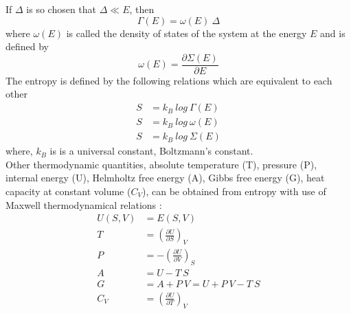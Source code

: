 If $\Delta $ is so chosen that $\Delta \ll E $, then
\begin{equation}
\Gamma(E) = \omega (E) ~ \Delta
\end{equation}
where $\omega(E)$ is called the density of states of the system at the energy $E$ and is
defined by 
\begin{equation}
\omega(E)= \frac{\partial \Sigma (E)}{\partial E}
\end{equation}
 The entropy is defined by the following relations which are equivalent to each other 
 \begin{align}
 S &= k_B~log~\Gamma(E) \nonumber \\
 S &= k_B~log~\omega(E) \\
 S &= k_B~log~\Sigma(E) \nonumber
 \end{align}
 where, $k_B$ is is a universal constant,  Boltzmann's constant. \\
 Other thermodynamic quantities, absolute temperature (T),  pressure (P), internal energy (U), Helmholtz free energy (A), Gibbs free energy (G), heat capacity at constant volume ($C_V$), can be obtained from entropy with use of Maxwell thermodynamical  relations \citep{huang2009}: 
 \begin{align}
  U (S, V)& = E (S, V) \nonumber \\
    T & = \left(  \frac{ \partial U} {\partial S }\right)_V  \nonumber \\
   P  &  = - \left(  \frac{ \partial U} {\partial V }\right)_S  \\
    A & = U - T~S \nonumber \\
     G & = A + P~ V = U + P~V - T~ S \nonumber\\
     C_V & = \left(  \frac{ \partial U} {\partial T }\right)_V  \nonumber
 \end{align}
